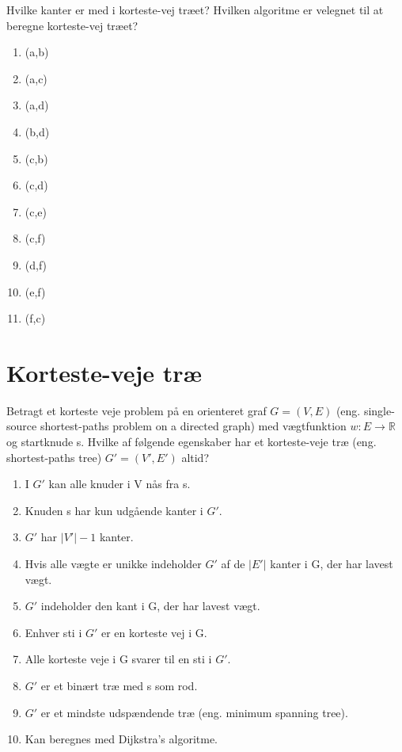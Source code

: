 \documentclass[12pt,a4paper]{article}
\begin{document}
Hvilke kanter er med i korteste-vej træet? Hvilken algoritme er velegnet til at beregne korteste-vej træet?

\begin{enumerate}
    \item (a,b)
    \item (a,c)
    \item (a,d)
    \item (b,d)
    \item (c,b)
    \item (c,d)
    \item (c,e)
    \item (c,f)
    \item (d,f)
    \item (e,f)
    \item (f,c)
\end{enumerate}

\section{Korteste-veje træ}

Betragt et korteste veje problem på en orienteret graf $G = (V, E)$ (eng. single-source shortest-paths problem on a directed graph) med vægtfunktion $w : E \to \mathbb{R}$ og startknude s. Hvilke af følgende egenskaber har et korteste-veje træ (eng. shortest-paths tree) $G' = (V', E')$ altid?

\begin{enumerate}
    \item I $G'$ kan alle knuder i V nås fra s.
    \item Knuden s har kun udgående kanter i $G'$.
    \item $G'$ har $|V'| - 1$ kanter.
    \item Hvis alle vægte er unikke indeholder $G'$ af de $|E'|$ kanter i G, der har lavest vægt.
    \item $G'$ indeholder den kant i G, der har lavest vægt.
    \item Enhver sti i $G'$ er en korteste vej i G.
    \item Alle korteste veje i G svarer til en sti i $G'$.
    \item $G'$ er et binært træ med s som rod.
    \item $G'$ er et mindste udspændende træ (eng. minimum spanning tree).
    \item Kan beregnes med Dijkstra's algoritme.
\end{enumerate}
\end{document}
